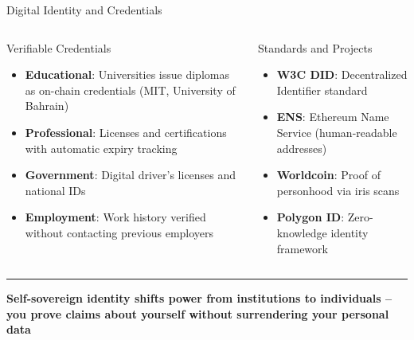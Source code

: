 \documentclass[8pt,aspectratio=169]{beamer}
\newcommand{\bottomnote}[1]{\vfill\vspace{-2mm}\textcolor{mllavender2}{\rule{\textwidth}{0.4pt}}\vspace{1mm}\footnotesize\textbf{#1}}
\begin{document}
\begin{frame}{Digital Identity and Credentials}
\begin{columns}[T]
\begin{block}{Verifiable Credentials}
\footnotesize
\begin{itemize}
  \item \textbf{Educational}: Universities issue diplomas as on-chain credentials (MIT, University of Bahrain)
  \item \textbf{Professional}: Licenses and certifications with automatic expiry tracking
  \item \textbf{Government}: Digital driver's licenses and national IDs
  \item \textbf{Employment}: Work history verified without contacting previous employers
\end{itemize}
\end{block}
\vspace{2mm}
\begin{exampleblock}{Standards and Projects}
\footnotesize
\begin{itemize}
  \item \textbf{W3C DID}: Decentralized Identifier standard
  \item \textbf{ENS}: Ethereum Name Service (human-readable addresses)
  \item \textbf{Worldcoin}: Proof of personhood via iris scans
  \item \textbf{Polygon ID}: Zero-knowledge identity framework
\end{itemize}
\end{exampleblock}
\end{columns}
\bottomnote{Self-sovereign identity shifts power from institutions to individuals -- you prove claims about yourself without surrendering your personal data}
\end{frame}
\end{document}
